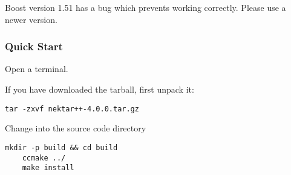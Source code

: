 \begin{warningbox}
Boost version 1.51 has a bug which prevents \nekpp working correctly.
Please use a newer version.
\end{warningbox}


\subsubsection{Quick Start}
Open a terminal.

If you have downloaded the tarball, first unpack it:
\begin{lstlisting}[style=BashInputStyle]
    tar -zxvf nektar++-4.0.0.tar.gz
\end{lstlisting}
Change into the  source code directory
\begin{lstlisting}[style=BashInputStyle]
    mkdir -p build && cd build 
    ccmake ../
    make install
\end{lstlisting}

